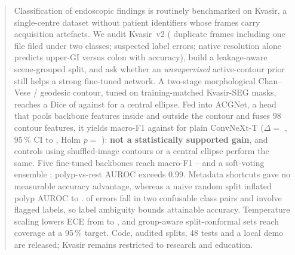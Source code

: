 \begin{abstract}
Classification of endoscopic findings is routinely benchmarked on Kvasir, a single-centre dataset without patient identifiers whose frames carry acquisition artefacts.
We audit Kvasir~v2 (\nDropped{} duplicate frames including one file filed under two classes; \flaggedPct{} suspected label errors; native resolution alone predicts upper-GI versus colon with \resOnlyAcc{} accuracy),
build a leakage-aware scene-grouped split, and ask whether an \emph{unsupervised} active-contour prior still helps a strong fine-tuned network.
A two-stage morphological Chan--Vese / geodesic contour, tuned on training-matched Kvasir-SEG masks, reaches a Dice of \acDice{} against \ellDice{} for a central ellipse.
Fed into ACGNet, a head that pools backbone features inside and outside the contour and fuses 98 contour features, it yields macro-F1 \acgF{} against \plainF{} for plain ConvNeXt-T
($\Delta=$ \acgDelta{}, 95\,\% CI \acgDeltaLo{} to \acgDeltaHi{}, Holm $p=$ \acgPHolm{}): \textbf{not a statistically supported gain}, and controls using shuffled-image contours or a central ellipse perform the same.
Five fine-tuned backbones reach macro-F1 \resnetF{}--\dinoF{} and a soft-voting ensemble \ensF{}; polyp-vs-rest AUROC exceeds 0.99.
Metadata shortcuts gave no measurable accuracy advantage, whereas a naive random split inflated polyp AUROC to \randsplitAU{}.
\errPairs{} of errors fall in two confusable class pairs and \errFlagged{} involve flagged labels, so label ambiguity bounds attainable accuracy.
Temperature scaling lowers ECE from \eceRaw{} to \eceCal{}, and group-aware split-conformal sets reach \confCov{} coverage at a 95\,\% target.
Code, audited splits, 48 tests and a local demo are released; Kvasir remains restricted to research and education.
\end{abstract}
